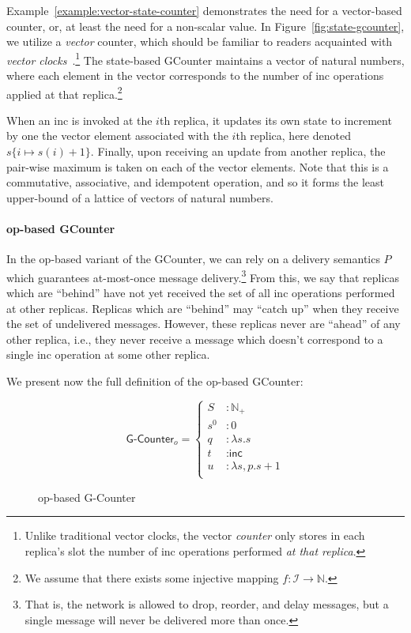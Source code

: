 Example~\ref{example:vector-state-counter} demonstrates the need for a
vector-based counter, or, at least the need for a non-scalar value. In
Figure~\ref{fig:state-gcounter}, we utilize a \emph{vector} counter, which
should be familiar to readers acquainted with \emph{vector
clocks}~\citep{lamport78}.\footnote{Unlike traditional vector clocks, the vector
\emph{counter} only stores in each replica's slot the number of \textsf{inc}
operations performed \emph{at that replica}.} The state-based GCounter maintains
a vector of natural numbers, where each element in the vector corresponds to the
number of \textsf{inc} operations applied at that replica.\footnote{We assume
that there exists some injective mapping $f : \mathcal{I} \to \mathbb{N}$.}

When an \textsf{inc} is invoked at the $i$th replica, it updates its own state
to increment by one the vector element associated with the $i$th replica, here
denoted $s\{i \mapsto s(i) + 1\}$. Finally, upon receiving an update from
another replica, the pair-wise maximum is taken on each of the vector elements.
Note that this is a commutative, associative, and idempotent operation, and so
it forms the least upper-bound of a lattice of vectors of natural numbers.

\paragraph{op-based GCounter} In the op-based variant of the GCounter, we can
rely on a delivery semantics $P$ which guarantees at-most-once message
delivery.\footnote{That is, the network is allowed to drop, reorder, and delay
messages, but a single message will never be delivered more than once.} From
this, we say that replicas which are ``behind'' have not yet received the set of
all \textsf{inc} operations performed at other replicas. Replicas which are
``behind'' may ``catch up'' when they receive the set of undelivered messages.
However, these replicas never are ``ahead'' of any other replica, i.e., they
never receive a message which doesn't correspond to a single \textsf{inc}
operation at some other replica.

We present now the full definition of the op-based GCounter:

\begin{figure}[H]
  \centering
  \[
    \textsf{G-Counter}_o = \left\{\begin{aligned}
      S &: \mathbb{N}_+ \\
      s^0 &: 0 \\
      q &: \lambda s. s \\
      t &: \textsf{inc} \\
      u &: \lambda s,p. s + 1 \\
    \end{aligned}\right.
  \]
  \caption{op-based \textsf{G-Counter} \CRDT}
\end{figure}

